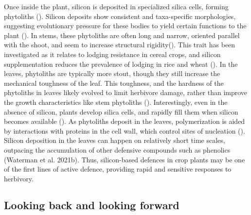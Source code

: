 \documentclass[12pt, letterpaper, ]{article}
\begin{document}
Once inside the plant, silicon is deposited in specialized silica cells, forming phytoliths (\cite{waterman_short-term_2021}). Silicon deposits show consistent and taxa-specific morphologies, suggesting evolutionary pressure for these bodies to yield certain functions to the plant (\cite{piperno_phytoliths_2006}). In stems, these phytoliths are often long and narrow, oriented parallel with the shoot, and seem to increase structural rigidity(\cite{stromberg_functions_2016}). This trait has been investigated as it relates to lodging resistance in cereal crops, and silicon supplementation reduces the prevalence of lodging in rice and wheat (\cite{dorairaj_influence_2017,muszynska_mechanistic_2021}). In the leaves, phytoliths are typically more stout, though they still increase the mechanical toughness of the leaf. This toughness, and the hardness of the phytoliths in leaves likely evolved to limit herbivore damage, rather than improve the growth characteristics like stem phytoliths (\cite{stromberg_functions_2016}). Interestingly, even in the absence of silicon, plants develop silica cells, and rapidly fill them when silicon becomes available (\cite{waterman_short-term_2021-1}). As phytoliths deposit in the leaves, polymerization is aided by interactions with proteins in the cell wall, which control sites of nucleation (\cite{nawaz_phytolith_2019}). Silicon deposition in the leaves can happen on relatively short time scales, outpacing the accumulation of other defensive compounds such as phenolics (Waterman et al. 2021b). Thus, silicon-based defences in crop plants may be one of the first lines of active defence, providing rapid and sensitive responses to herbivory. 

\subsection{Looking back and looking forward}
\end{document}
